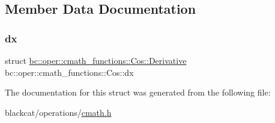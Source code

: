 \subsection{Member Data Documentation}
\mbox{\label{structbc_1_1oper_1_1cmath__functions_1_1Cos_a062dd5e1b8667637520840ebe3b05ba5}} 
\subsubsection{\texorpdfstring{dx}{dx}}
{\footnotesize\ttfamily struct \hyperlink{structbc_1_1oper_1_1cmath__functions_1_1Cos_1_1Derivative}{bc\+::oper\+::cmath\+\_\+functions\+::\+Cos\+::\+Derivative}   bc\+::oper\+::cmath\+\_\+functions\+::\+Cos\+::dx}



The documentation for this struct was generated from the following file\+:\begin{DoxyCompactItemize}
\item 
blackcat/operations/\hyperlink{cmath_8h}{cmath.\+h}\end{DoxyCompactItemize}
